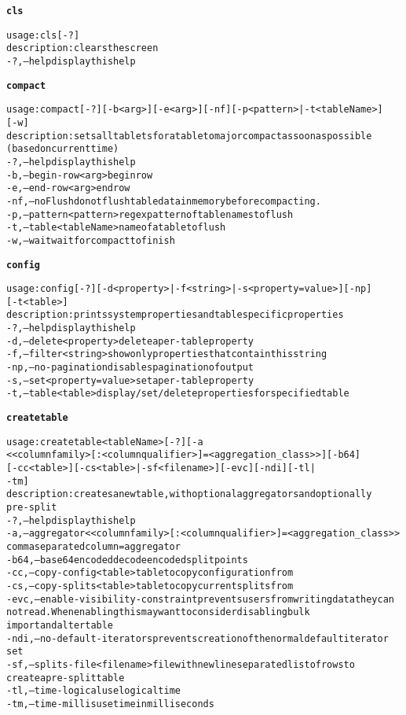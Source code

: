 \begin{alltt}
\textbf{cls}

    usage: cls [-?]
    description: clears the screen
      -?,--help  display this help

\textbf{compact}

    usage: compact [-?] [-b <arg>] [-e <arg>] [-nf] [-p <pattern> | -t <tableName>] 
    	      [-w]
    description: sets all tablets for a table to major compact as soon as possible
    	      (based on current time)
      -?,--help  display this help
      -b,--begin-row <arg>	begin row
      -e,--end-row <arg>  end row
      -nf,--noFlush  do not flush table data in memory before compacting.
      -p,--pattern <pattern>  regex pattern of table names to flush
      -t,--table <tableName>  name of a table to flush
      -w,--wait  wait for compact to finish

\textbf{config}

    usage: config [-?] [-d <property> | -f <string> | -s <property=value>]	[-np] 
    	      [-t <table>]
    description: prints system properties and table specific properties
      -?,--help  display this help
      -d,--delete <property>  delete a per-table property
      -f,--filter <string>	show only properties that contain this string
      -np,--no-pagination  disables pagination of output
      -s,--set <property=value>  set a per-table property
      -t,--table <table>  display/set/delete properties for specified table

\textbf{createtable}

    usage: createtable <tableName> [-?] [-a
    	      <{<columnfamily>[:<columnqualifier>]=<aggregation\_class>}>] [-b64]
    	      [-cc <table>] [-cs <table> | -sf <filename>] [-evc] [-ndi]  [-tl |
    	      -tm]
    description: creates a new table, with optional aggregators and optionally
    	      pre-split
      -?,--help  display this help
      -a,--aggregator <{<columnfamily>[:<columnqualifier>]=<aggregation\_class>}> 
    	      comma separated column=aggregator
      -b64,--base64encoded	decode encoded split points
      -cc,--copy-config <table>  table to copy configuration from
      -cs,--copy-splits <table>  table to copy current splits from
      -evc,--enable-visibility-constraint  prevents users from writing data they can
    	      not read.  When enabling this may want to consider disabling bulk
    	      import and alter table
      -ndi,--no-default-iterators  prevents creation of the normal default iterator
    	      set
      -sf,--splits-file <filename>	file with newline separated list of rows to
    	      create a pre-split table
      -tl,--time-logical  use logical time
      -tm,--time-millis  use time in milliseconds


\end{alltt}
